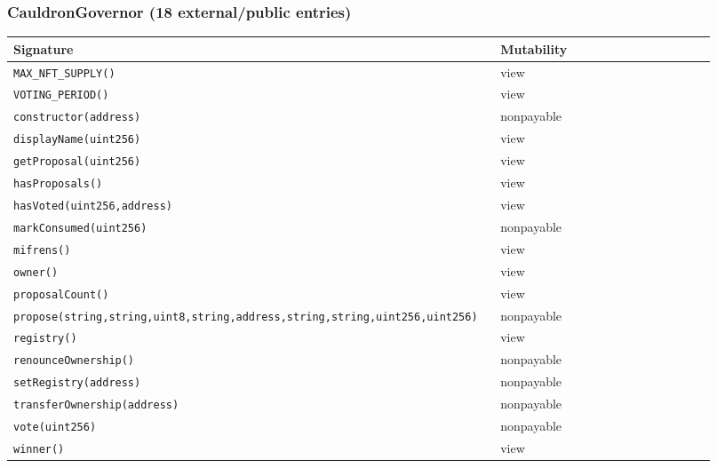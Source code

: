 \subsubsection*{CauldronGovernor \;\normalfont\small(18 external/public entries)}
\begin{longtable}{@{}p{0.62\linewidth}p{0.30\linewidth}@{}}
\toprule \textbf{Signature} & \textbf{Mutability} \\ \midrule \endhead
\texttt{\scriptsize MAX\_NFT\_SUPPLY()} & view \\
\texttt{\scriptsize VOTING\_PERIOD()} & view \\
\texttt{\scriptsize constructor(address)} & nonpayable \\
\texttt{\scriptsize displayName(uint256)} & view \\
\texttt{\scriptsize getProposal(uint256)} & view \\
\texttt{\scriptsize hasProposals()} & view \\
\texttt{\scriptsize hasVoted(uint256,address)} & view \\
\texttt{\scriptsize markConsumed(uint256)} & nonpayable \\
\texttt{\scriptsize mifrens()} & view \\
\texttt{\scriptsize owner()} & view \\
\texttt{\scriptsize proposalCount()} & view \\
\texttt{\scriptsize propose(string,string,uint8,string,address,string,string,uint256,uint256)} & nonpayable \\
\texttt{\scriptsize registry()} & view \\
\texttt{\scriptsize renounceOwnership()} & nonpayable \\
\texttt{\scriptsize setRegistry(address)} & nonpayable \\
\texttt{\scriptsize transferOwnership(address)} & nonpayable \\
\texttt{\scriptsize vote(uint256)} & nonpayable \\
\texttt{\scriptsize winner()} & view \\
\bottomrule\end{longtable}

